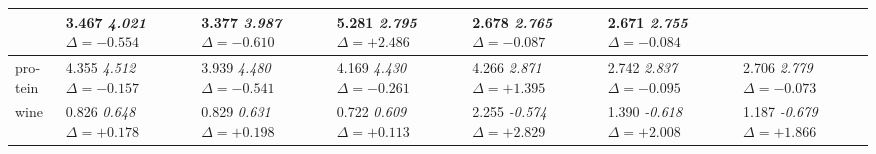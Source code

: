 \begin{otherlanguage}{ngerman}
\begin{table*}[!htbp]
\begin{tabularx}{\textwidth}{|l|X|X|X|X|X|X|}
& 3.467 \newline \textit{4.021} \newline \mbox{$\Delta=-0.554$} 
& 3.377 \newline \textit{3.987} \newline \mbox{$\Delta=-0.610$} 
& 5.281 \newline \textit{2.795} \newline \mbox{$\Delta=+2.486$} 
& 2.678 \newline \textit{2.765} \newline \mbox{$\Delta=-0.087$} 
& 2.671 \newline \textit{2.755} \newline \mbox{$\Delta=-0.084$} \\ \hline
protein 
& 4.355 \newline \textit{4.512} \newline \mbox{$\Delta=-0.157$} 
& 3.939 \newline \textit{4.480} \newline \mbox{$\Delta=-0.541$} 
& 4.169 \newline \textit{4.430} \newline \mbox{$\Delta=-0.261$} 
& 4.266 \newline \textit{2.871} \newline \mbox{$\Delta=+1.395$} 
& 2.742 \newline \textit{2.837} \newline \mbox{$\Delta=-0.095$} 
& 2.706 \newline \textit{2.779} \newline \mbox{$\Delta=-0.073$} \\ \hline
wine 
& 0.826 \newline \textit{0.648} \newline \mbox{$\Delta=+0.178$} 
& 0.829 \newline \textit{0.631} \newline \mbox{$\Delta=+0.198$} 
& 0.722 \newline \textit{0.609} \newline \mbox{$\Delta=+0.113$} 
& 2.255 \newline \textit{-0.574} \newline \mbox{$\Delta=+2.829$} 
& 1.390 \newline \textit{-0.618} \newline \mbox{$\Delta=+2.008$} 
& 1.187 \newline \textit{-0.679} \newline \mbox{$\Delta=+1.866$} \\ \hline

\end{tabularx}
\end{table*}
\end{otherlanguage}

